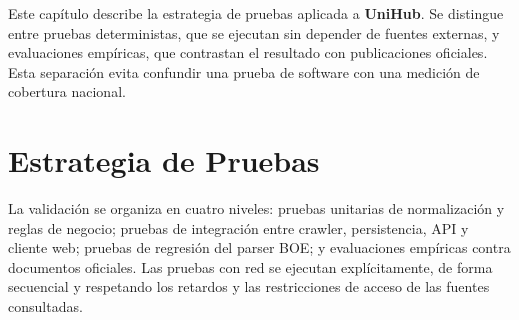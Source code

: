 
Este capítulo describe la estrategia de pruebas aplicada a \textbf{UniHub}. Se distingue entre pruebas deterministas, que se ejecutan sin depender de fuentes externas, y evaluaciones empíricas, que contrastan el resultado con publicaciones oficiales. Esta separación evita confundir una prueba de software con una medición de cobertura nacional.

\section{Estrategia de Pruebas}
La validación se organiza en cuatro niveles: pruebas unitarias de normalización y reglas de negocio; pruebas de integración entre crawler, persistencia, API y cliente web; pruebas de regresión del parser BOE; y evaluaciones empíricas contra documentos oficiales. Las pruebas con red se ejecutan explícitamente, de forma secuencial y respetando los retardos y las restricciones de acceso de las fuentes consultadas.

